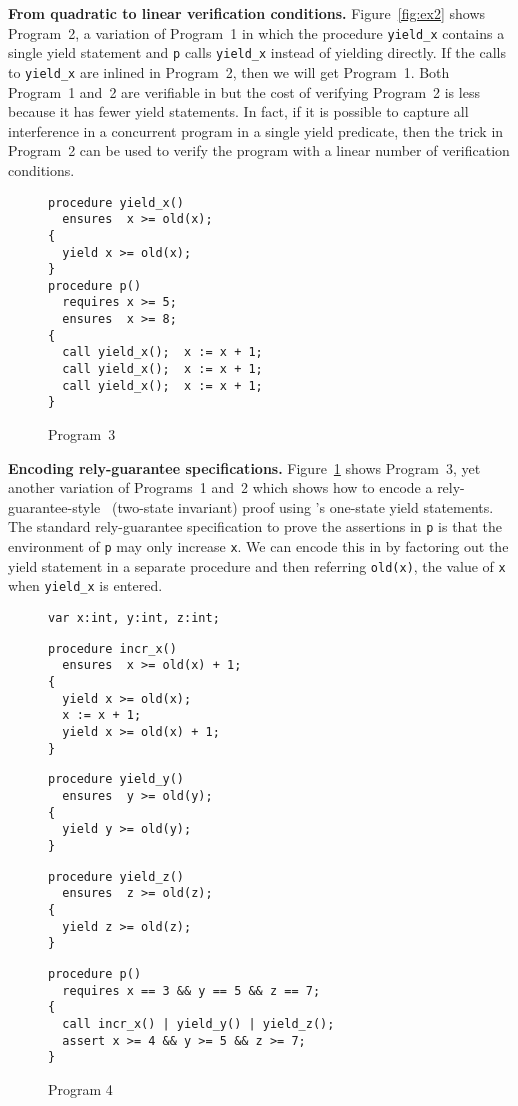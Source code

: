 {\bf From quadratic to linear verification conditions.}
Figure~\ref{fig:ex2} shows Program~2, a variation of Program~1 in which the procedure {\tt yield\_x} 
contains a single yield statement and {\tt p} calls {\tt yield\_x} instead of yielding directly.
If the calls to {\tt yield\_x} are inlined in Program~2, then we will get Program~1.
Both Program~1 and~2 are verifiable in \civl but the cost of verifying Program~2 is less because it has fewer yield statements.
In fact, if it is possible to capture all interference in a concurrent program in a single yield predicate, 
then the trick in Program~2 can be used to verify the program with a linear number of verification conditions.

\begin{figure}
\begin{verbatim}
procedure yield_x()
  ensures  x >= old(x);
{
  yield x >= old(x);
}
procedure p()
  requires x >= 5;
  ensures  x >= 8;
{
  call yield_x();  x := x + 1;
  call yield_x();  x := x + 1;
  call yield_x();  x := x + 1;
}
\end{verbatim}
\caption{Program~3}
\label{fig:ex3}
\end{figure}

{\bf Encoding rely-guarantee specifications.}
Figure~\ref{fig:ex3} shows Program~3, yet another variation of Programs~1 and~2 which shows how to encode a rely-guarantee-style~\cite{Jones83} (two-state invariant)
proof using \civl's one-state yield statements. 
The standard rely-guarantee specification to prove the assertions in {\tt p} is that the environment of {\tt p} 
may only increase {\tt x}.
We can encode this in \civl by factoring out the yield statement in a separate procedure
and then referring {\tt old(x)}, the value of {\tt x} when {\tt yield\_x} is
entered. 


\begin{figure}
\begin{verbatim}
var x:int, y:int, z:int;
\end{verbatim}
\begin{verbatim}
procedure incr_x()
  ensures  x >= old(x) + 1;
{
  yield x >= old(x);
  x := x + 1;
  yield x >= old(x) + 1;
}
\end{verbatim}
\begin{verbatim}
procedure yield_y()
  ensures  y >= old(y);
{
  yield y >= old(y);
}
\end{verbatim}
\begin{verbatim}
procedure yield_z()
  ensures  z >= old(z);
{
  yield z >= old(z);
}
\end{verbatim}
\begin{verbatim}
procedure p()
  requires x == 3 && y == 5 && z == 7;
{
  call incr_x() | yield_y() | yield_z();
  assert x >= 4 && y >= 5 && z >= 7;
}
\end{verbatim}
\caption{Program 4}
\label{fig:ex4}
\end{figure}

